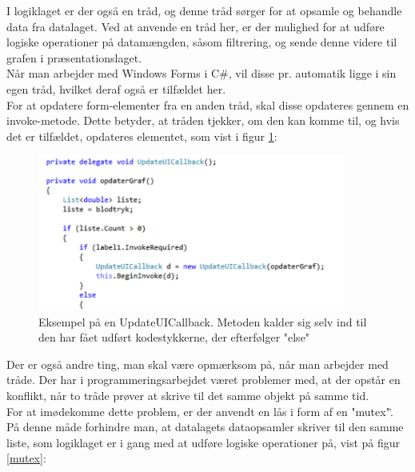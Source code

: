 I logiklaget er der også en tråd, og denne tråd sørger for at opsamle og behandle data fra datalaget. Ved at anvende en tråd her, er der mulighed for at udføre logiske operationer på datamængden, såsom filtrering, og sende denne videre til grafen i præsentationslaget.\\
Når man arbejder med Windows Forms i C\#, vil disse pr. automatik ligge i sin egen tråd, hvilket deraf også er tilfældet her.\\
For at opdatere form-elementer fra en anden tråd, skal disse opdateres gennem en invoke-metode. Dette betyder, at tråden tjekker, om den kan komme til, og hvis det er tilfældet, opdateres elementet, som vist i figur \ref{callback}:

\begin{figure}[H]
	\centering
	\includegraphics[width=0.9\textwidth]{Figurer/SoftwareImplementering/callback}
	\caption{Eksempel på en UpdateUICallback. Metoden kalder sig selv ind til den har fået udført kodestykkerne, der efterfølger "else"\ }
	\label{callback}
\end{figure}

Der er også andre ting, man skal være opmærksom på, når man arbejder med tråde. Der har i programmeringsarbejdet været problemer med, at der opstår en konflikt, når to tråde prøver at skrive til det samme objekt på samme tid.\\
For at imødekomme dette problem, er der anvendt en lås i form af en "mutex"\.. På denne måde forhindre man, at datalagets dataopsamler skriver til den samme liste, som logiklaget er i gang med at udføre logiske operationer på, vist på figur \ref{mutex}:

